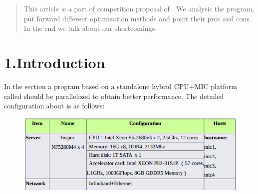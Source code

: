 \documentclass{article}
\begin{document}
\mdxtitleblockstart{}
\mdxauthorstart{}
\mdxauthorend\mdtitleauthorrunning{}{}\mdxtitleblockend%

\begin{abstract}%

\noindent{}This article is a part of competition proposal of . We analysis the  program, put forward different optimization methods and point their pros and cons. In the end we talk about our shortcomings.%
\end{abstract}%

\section{1.\hspace*{0.5em}Introduction}\label{sec-introduction}%

\noindent{}In the section a program based on a standalone hybrid CPU+MIC platform called  should be parallelized to obtain better performance. The detailed configuration about is as follows:%

\begin{figure}[tbp]%
\begin{mdcenter}%

\noindent{}\includegraphics[keepaspectratio=true,width=\dimmin{}{\dimwidth{0.90}}]{images/2016-02-18-23-01-13-}{}%

\mdhr{}%

\noindent{}%
\end{mdcenter}\label{fig-myfigure}%
\end{figure}%
\end{document}
